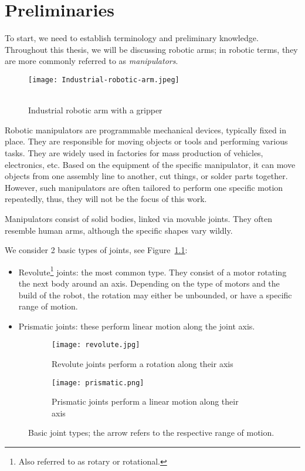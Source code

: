 \chapter{Preliminaries}

To start, we need to establish terminology and preliminary knowledge. Throughout this thesis, we will be discussing robotic arms; in robotic terms, they are more commonly referred to as \textit{manipulators}.

\begin{wrapfigure}{r}{0.35\textwidth}
    \centering
    \texttt{[image: Industrial-robotic-arm.jpeg]}
  \caption{\\Industrial robotic arm with a gripper~\cite{manipulator}}
\end{wrapfigure}


Robotic manipulators are programmable mechanical devices, typically fixed in place. They are responsible for moving objects or tools and performing various tasks. They are widely used in factories for mass production of vehicles, electronics, etc. Based on the equipment of the specific manipulator, it can move objects from one assembly line to another, cut things, or solder parts together. However, such manipulators are often tailored to perform one specific motion repeatedly, thus, they will not be the focus of this work.

Manipulators consist of solid bodies, linked via movable joints. They often resemble human arms, although the specific shapes vary wildly.

We consider 2 basic types of joints, see Figure~\ref{fig:basicjoints}:
\begin{itemize}
  \item Revolute\footnote{Also referred to as rotary or rotational.} joints: the most common type. They consist of a motor rotating the next body around an axis. Depending on the type of motors and the build of the robot, the rotation may either be unbounded, or have a specific range of motion.
  \item Prismatic joints: these perform linear motion along the joint axis.
\end{itemize}

\begin{figure}[h]
\centering
\begin{subfigure}{.5\textwidth}
  \centering
  \texttt{[image: revolute.jpg]}
  \caption{Revolute joints perform a rotation along their axis}
\end{subfigure}%
\begin{subfigure}{.5\textwidth}
  \centering
  \texttt{[image: prismatic.png]}
  \caption{Prismatic joints perform a linear motion along their axis}
\end{subfigure}
\caption{Basic joint types; the arrow refers to the respective range of motion.}
\label{fig:basicjoints}
\end{figure}

